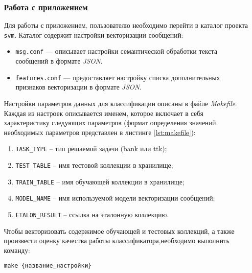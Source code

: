     \subsubsection{Работа с приложением}

        Для работы с приложением, пользователю необходимо перейти в каталог проекта {\tt svm}.
        Каталог содержит настройки векторизации сообщений:
        \begin{itemize}
            \item {\tt msg.conf} --- описывает настройки семантической обработки текста
                сообщений в формате {\it JSON}.
            \item {\tt features.conf} --- предоставляет настройку списка
                дополнительных признаков векторизации в формате {\it JSON}.
        \end{itemize}

        Настройки параметров данных для классификации описаны в файле {\it Makefile}.
        Каждая из настроек описывается именем, которое включает в себя
        характеристику следующих параметров (формат определения значений необходимых
        параметров представлен в листинге \ref{lst:makefile}):

        \begin{enumerate}
            \item {\tt TASK\_TYPE} -- тип решаемой задачи ({bank} или {ttk});
            \item {\tt TEST\_TABLE} -- имя тестовой коллекции в хранилище;
            \item {\tt TRAIN\_TABLE} -- имя обучающей коллекции в хранилище;
            \item {\tt MODEL\_NAME} -- имя используемой модели векторизации сообщений;
            \item {\tt ETALON\_RESULT} -- ссылка на эталонную коллекцию.
        \end{enumerate}

        \lstset{style=bash}
        

        Чтобы векторизовать содержимое обучающей и тестовых коллекций, а также
        произвести оценку качества работы классификатора,необходимо выполнить
        команду:
        \begin{center}
            {\tt make {\{название\_настройки\}}}
        \end{center}


